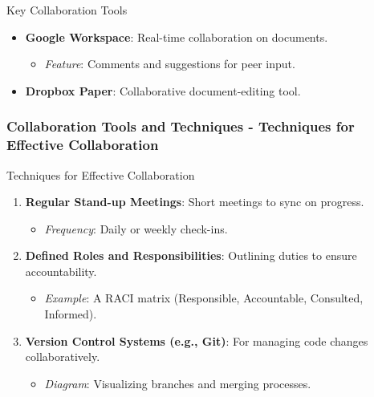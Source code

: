 \documentclass[aspectratio=169]{beamer}
\begin{document}
\begin{frame}[fragile]
\begin{block}{Key Collaboration Tools}
\begin{enumerate}
                \begin{itemize}
                    \item \textbf{Google Workspace}: Real-time collaboration on documents.
                          \begin{itemize}
                              \item \textit{Feature}: Comments and suggestions for peer input.
                          \end{itemize}
                    \item \textbf{Dropbox Paper}: Collaborative document-editing tool.
                \end{itemize}
        \end{enumerate}
    \end{block}
\end{frame}

\begin{frame}[fragile]
    \frametitle{Collaboration Tools and Techniques - Techniques for Effective Collaboration}
    \begin{block}{Techniques for Effective Collaboration}
        \begin{enumerate}
            \item \textbf{Regular Stand-up Meetings}: Short meetings to sync on progress.
                  \begin{itemize}
                      \item \textit{Frequency}: Daily or weekly check-ins.
                  \end{itemize}
            \item \textbf{Defined Roles and Responsibilities}: Outlining duties to ensure accountability.
                  \begin{itemize}
                      \item \textit{Example}: A RACI matrix (Responsible, Accountable, Consulted, Informed).
                  \end{itemize}
            \item \textbf{Version Control Systems (e.g., Git)}: For managing code changes collaboratively.
                  \begin{itemize}
                      \item \textit{Diagram}: Visualizing branches and merging processes.
                  \end{itemize}
        \end{enumerate}
    \end{block}
\end{frame}
\end{document}
